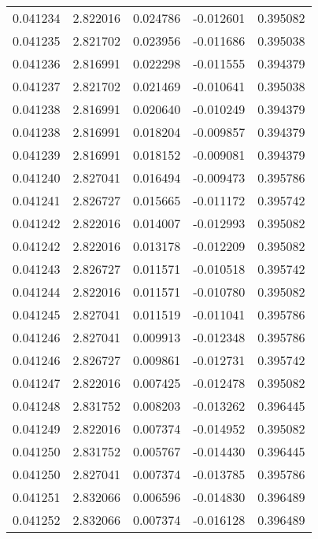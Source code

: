 \begin{tabular}{lrrrr}
0.041234    &  2.822016 &  0.024786 & -0.012601 &             0.395082 \\
0.041235    &  2.821702 &  0.023956 & -0.011686 &             0.395038 \\
0.041236    &  2.816991 &  0.022298 & -0.011555 &             0.394379 \\
0.041237    &  2.821702 &  0.021469 & -0.010641 &             0.395038 \\
0.041238    &  2.816991 &  0.020640 & -0.010249 &             0.394379 \\
0.041238    &  2.816991 &  0.018204 & -0.009857 &             0.394379 \\
0.041239    &  2.816991 &  0.018152 & -0.009081 &             0.394379 \\
0.041240    &  2.827041 &  0.016494 & -0.009473 &             0.395786 \\
0.041241    &  2.826727 &  0.015665 & -0.011172 &             0.395742 \\
0.041242    &  2.822016 &  0.014007 & -0.012993 &             0.395082 \\
0.041242    &  2.822016 &  0.013178 & -0.012209 &             0.395082 \\
0.041243    &  2.826727 &  0.011571 & -0.010518 &             0.395742 \\
0.041244    &  2.822016 &  0.011571 & -0.010780 &             0.395082 \\
0.041245    &  2.827041 &  0.011519 & -0.011041 &             0.395786 \\
0.041246    &  2.827041 &  0.009913 & -0.012348 &             0.395786 \\
0.041246    &  2.826727 &  0.009861 & -0.012731 &             0.395742 \\
0.041247    &  2.822016 &  0.007425 & -0.012478 &             0.395082 \\
0.041248    &  2.831752 &  0.008203 & -0.013262 &             0.396445 \\
0.041249    &  2.822016 &  0.007374 & -0.014952 &             0.395082 \\
0.041250    &  2.831752 &  0.005767 & -0.014430 &             0.396445 \\
0.041250    &  2.827041 &  0.007374 & -0.013785 &             0.395786 \\
0.041251    &  2.832066 &  0.006596 & -0.014830 &             0.396489 \\
0.041252    &  2.832066 &  0.007374 & -0.016128 &             0.396489 \\

\end{tabular}
